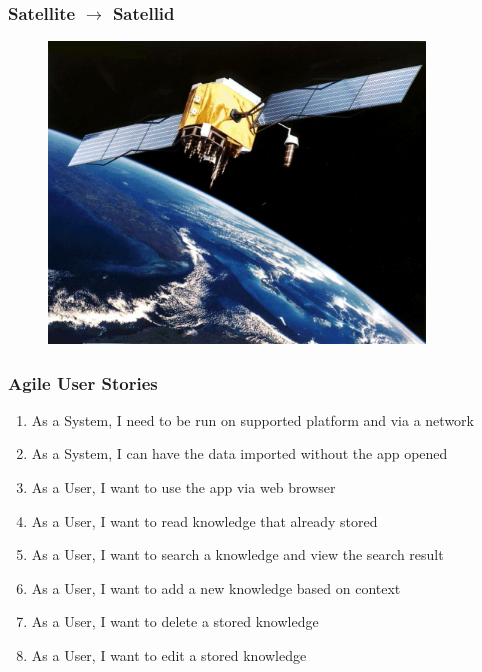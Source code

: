 \documentclass[10pt, compress]{beamer}
\begin{document}

\begin{frame}[fragile]
  \frametitle{Satellite $\rightarrow$ Satellid}

  \begin{figure}[ht]
    \centering
    \vspace{-1cm}
    \includegraphics[width=10cm]{include/satellite.jpg}
    \label{fig:satellite}
  \end{figure}

\end{frame}


\begin{frame}[fragile]
  \frametitle{Agile User Stories}

  \begin{enumerate} \itemsep0pt
    \item As a System, I need to be run on supported platform and via a network
    \item As a System, I can have the data imported without the app opened
    \item As a User, I want to use the app via web browser
    \item As a User, I want to read knowledge that already stored
    \item As a User, I want to search a knowledge and view the search result
    \item As a User, I want to add a new knowledge based on context
    \item As a User, I want to delete a stored knowledge
    \item As a User, I want to edit a stored knowledge
  \end{enumerate}

\end{frame}
\end{document}
